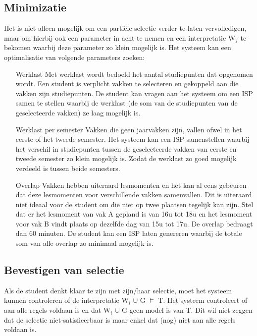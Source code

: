 \subsection{Minimizatie}
Het is niet alleen mogelijk om een parti\"{e}le selectie verder te laten vervolledigen, maar om hierbij ook een parameter in acht te nemen en een interpretatie W$_{f}$ te bekomen waarbij deze parameter zo klein mogelijk is. Het systeem kan een optimalisatie van volgende parameters zoeken:
\begin{itemize}
\item[Werklast] Met werklast wordt bedoeld het aantal studiepunten dat opgenomen wordt. Een student is verplicht vakken te selecteren en gekoppeld aan die vakken zijn studiepunten. De student kan vragen aan het systeem om een ISP samen te stellen waarbij de werklast (de som van de studiepunten van de geselecteerde vakken) ze laag mogelijk is.
\item[Werklast per semester] Vakken die geen jaarvakken zijn, vallen ofwel in het eerste of het tweede semester. Het systeem kan een ISP samenstellen waarbij het verschil in studiepunten tussen de geselecteerde vakken van eerste en tweede semester zo klein mogelijk is. Zodat de werklast zo goed mogelijk verdeeld is tussen beide semesters.
\item[Overlap] Vakken hebben uiteraard lesmomenten en het kan al eens gebeuren dat deze lesmomenten voor verschillende vakken samenvallen. Dit is uiteraard niet ideaal voor de student om die niet op twee plaatsen tegelijk kan zijn. Stel dat er het lesmoment van vak A gepland is van 16u tot 18u en het lesmoment voor vak B vindt plaats op dezelfde dag van 15u tot 17u. De overlap bedraagt dan 60 minuten. De student kan een ISP laten genereren waarbij de totale som van alle overlap zo minimaal mogelijk is. 
\end{itemize}

\subsection{Bevestigen van selectie}
Als de student denkt klaar te zijn met zijn/haar selectie, moet het systeem kunnen controleren of de interpretatie W$_{i}$ $\cup$ G $\models$ T. Het systeem controleert of aan alle regels voldaan is en dat W$_{i}$ $\cup$ G geen model is van T. Dit wil niet zeggen dat de selectie niet-satisfieerbaar is maar enkel dat (nog) niet aan alle regels voldaan is. 

